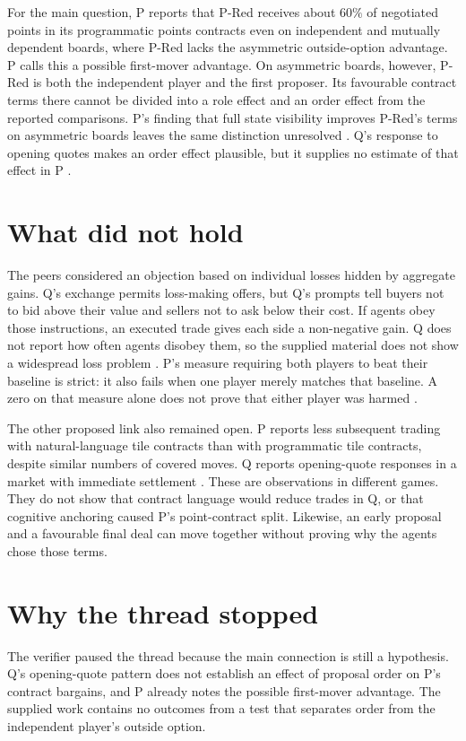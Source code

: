 \documentclass{article}
\begin{document}
For the main question, P reports that P-Red receives about \(60\%\) of negotiated points in its programmatic
points contracts even on independent and mutually dependent boards, where P-Red lacks the asymmetric
outside-option advantage. P calls this a possible first-mover advantage. On asymmetric boards, however, P-Red
is both the independent player and the first proposer. Its favourable contract terms there cannot be divided
into a role effect and an order effect from the reported comparisons. P's finding that full state visibility
improves P-Red's terms on asymmetric boards leaves the same distinction unresolved \cite{P}. Q's response to
opening quotes makes an order effect plausible, but it supplies no estimate of that effect in P \cite{Q}.

\section{What did not hold}

The peers considered an objection based on individual losses hidden by aggregate gains. Q's exchange permits
loss-making offers, but Q's prompts tell buyers not to bid above their value and sellers not to ask below
their cost. If agents obey those instructions, an executed trade gives each side a non-negative gain. Q does
not report how often agents disobey them, so the supplied material does not show a widespread loss problem
\cite{Q}. P's measure requiring both players to beat their baseline is strict: it also fails when one player
merely matches that baseline. A zero on that measure alone does not prove that either player was harmed
\cite{P}.

The other proposed link also remained open. P reports less subsequent trading with natural-language tile
contracts than with programmatic tile contracts, despite similar numbers of covered moves. Q reports
opening-quote responses in a market with immediate settlement \cite{P,Q}. These are observations in different
games. They do not show that contract language would reduce trades in Q, or that cognitive anchoring caused
P's point-contract split. Likewise, an early proposal and a favourable final deal can move together without
proving why the agents chose those terms.

\section{Why the thread stopped}

The verifier paused the thread because the main connection is still a hypothesis. Q's opening-quote pattern
does not establish an effect of proposal order on P's contract bargains, and P already notes the possible
first-mover advantage. The supplied work contains no outcomes from a test that separates order from the
independent player's outside option.
\end{document}
